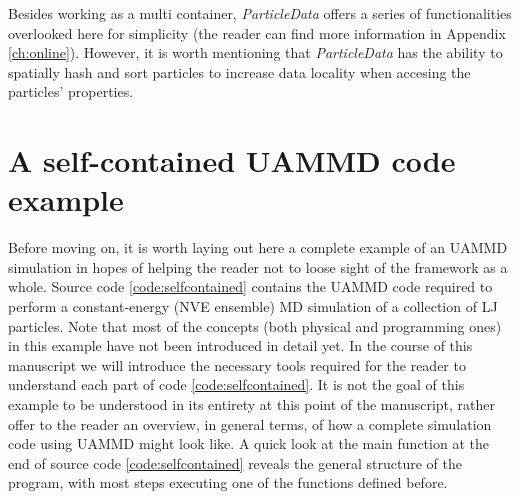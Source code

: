 \documentclass[ twoside,openright,titlepage,numbers=noenddot,%
headinclude,footinclude,cleardoublepage=empty,abstract=on,
BCOR=5mm,paper=b5,fontsize=11pt, dvipsnames
]{scrreprt}
\begin{document}
Besides working as a multi container, \emph{ParticleData} offers a series of functionalities overlooked here for simplicity (the reader can find more information in Appendix \ref{ch:online}). However, it is worth mentioning that \emph{ParticleData} has the ability to spatially hash and sort particles to increase data locality when accesing the particles' properties.



\chapter{A self-contained UAMMD code example}

Before moving on, it is worth laying out here a complete example of an UAMMD simulation in hopes of helping the reader not to loose sight of the framework as a whole. Source code \ref{code:selfcontained} contains the UAMMD code required to perform a constant-energy (NVE ensemble) \gls{MD} simulation of a collection of \gls{LJ} particles.
Note that most of the concepts (both physical and programming ones) in this example have not been introduced in detail yet. In the course of this manuscript we will introduce the necessary tools required for the reader to understand each part of code \ref{code:selfcontained}. It is not the goal of this example to be understood in its entirety at this point of the manuscript, rather offer to the reader an overview, in general terms, of how a complete simulation code using UAMMD might look like.
A quick look at the main function at the end of source code \ref{code:selfcontained} reveals the general structure of the program, with most steps executing one of the functions defined before.

\newpage
\end{document}
